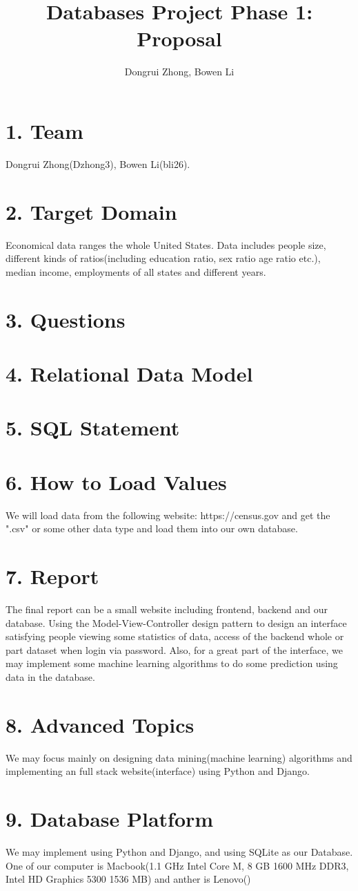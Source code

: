 \documentclass{article}
\author{Dongrui Zhong, Bowen Li}
\title{Databases Project Phase 1: Proposal}
\begin{document}
\maketitle
\section*{1. Team}
Dongrui Zhong(Dzhong3), Bowen Li(bli26).

\section*{2. Target Domain}
Economical data ranges the whole United States. Data includes people size, different kinds of ratios(including education ratio, sex ratio age ratio etc.), median income, employments of all states and different years.

\section*{3. Questions}

\section*{4. Relational Data Model}

\section*{5. SQL Statement}

\section*{6. How to Load Values}
We will load data from the following website: https://census.gov and get the ".csv" or some other data type and load them into our own database. 

\section*{7. Report}
The final report can be a small website including frontend, backend and our database. Using the Model-View-Controller design pattern to design an interface satisfying people viewing some statistics of data, access of the backend whole or part dataset when login via password. Also, for a great part of the interface, we may implement some machine learning algorithms to do some prediction using data in the database.

\section*{8. Advanced Topics}
We may focus mainly on designing data mining(machine learning) algorithms and implementing an full stack website(interface) using Python and Django. 

\section*{9. Database Platform}
We may implement using Python and Django, and using SQLite as our Database. One of our computer is Macbook(1.1 GHz Intel Core M, 8 GB 1600 MHz DDR3, Intel HD Graphics 5300 1536 MB) and anther is Lenovo()
\end{document}
